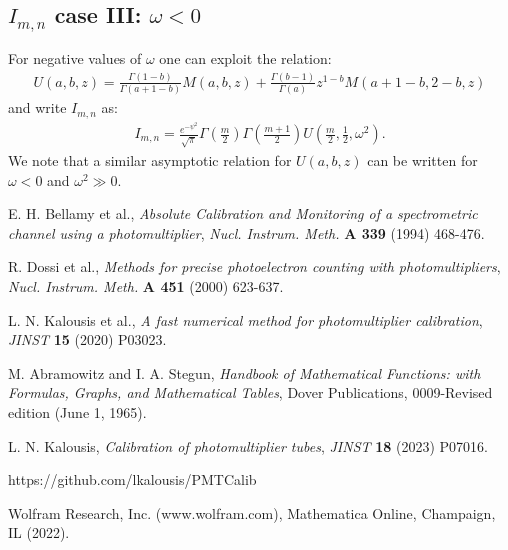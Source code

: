\documentclass[preprint,12pt]{elsarticle}
\begin{document}
\subsection*{$I_{m,n}$ case III: $ \omega <0$}
%

For negative values of $\omega$ one can exploit the relation:
\begin{align}
U(a,b,z) = \frac{\Gamma(1-b) }{\Gamma(a+1-b)}M(a,b,z) + \frac{\Gamma(b-1) }{\Gamma(a)} z^{1-b} M(a+1-b, 2-b, z )
\end{align}
and write $I_{m,n}$ as:
\begin{align}
I_{m,n} = \frac{ e^{ -\psi^2 } }{ \sqrt{\pi} }\Gamma\left( \frac{m}{2} \right)   \Gamma\left( \frac{m+1}{2} \right) U\left( \frac{m}{2}, \frac{1}{2}, \omega^2  \right). 
\end{align}
We note that a similar  asymptotic relation for $U(a,b,z)$ can be written for $\omega<0$ and $\omega^2 \gg 0$. 




\begin{thebibliography}{00}


 E. H. Bellamy {et al.}, \emph{Absolute Calibration and Monitoring of a spectrometric channel using a photomultiplier}, 
\emph{Nucl. Instrum. Meth.} {\bf A 339} (1994) 468-476. 

  R. Dossi {et al.}, \emph{Methods for precise photoelectron counting with photomultipliers}, 
\emph{Nucl. Instrum. Meth.} {\bf A 451} (2000) 623-637.

 L. N. Kalousis {et al.}, \emph{A fast numerical method for photomultiplier calibration}, \emph{JINST} {\bf 15} (2020) P03023.

 M. Abramowitz and I. A. Stegun, \emph{Handbook of Mathematical Functions: with Formulas, Graphs, and Mathematical Tables}, Dover Publications, 0009-Revised edition (June 1, 1965).  

 L. N. Kalousis, \emph{Calibration of photomultiplier tubes}, \emph{JINST} {\bf 18} (2023) P07016.

 https://github.com/lkalousis/PMTCalib

 Wolfram Research, Inc. (www.wolfram.com), Mathematica Online, Champaign, IL (2022).


\end{thebibliography}
\end{document}
